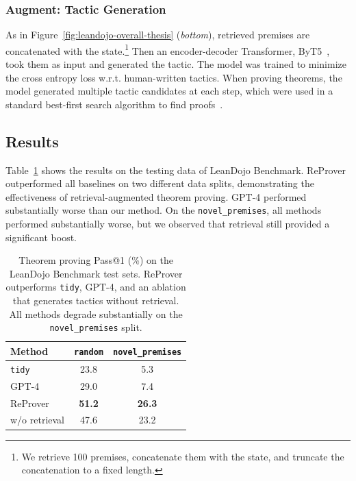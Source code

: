 \subsubsection{Augment: Tactic Generation}

As in Figure~\ref{fig:leandojo-overall-thesis} (\emph{bottom}), retrieved
premises are concatenated with the state.\footnote{We retrieve 100 premises,
concatenate them with the state, and truncate the concatenation to a fixed
length.} Then an encoder-decoder Transformer, ByT5~\citep{xue2022byt5}, took
them as input and generated the tactic. The model was trained to minimize the
cross entropy loss w.r.t. human-written tactics. When proving theorems, the
model generated multiple tactic candidates at each step, which were used in a
standard best-first search algorithm to find proofs~\citep{han2022proof}.

\subsection{Results}

Table~\ref{tab:leandojo-proving-thesis} shows the results on the testing data
of LeanDojo Benchmark. ReProver outperformed all baselines on two different
data splits, demonstrating the effectiveness of retrieval-augmented theorem
proving. GPT-4 performed substantially worse than our method. On the \texttt{novel\_premises},
all methods performed substantially worse, but we observed that retrieval still
provided a significant boost.

\begin{table}[tbp]
\caption{Theorem proving Pass@1 (\%) on the LeanDojo Benchmark test sets.
ReProver outperforms \texttt{tidy}, GPT-4, and an ablation that generates
tactics without retrieval. All methods degrade substantially on the
\texttt{novel\_premises} split.}
\label{tab:leandojo-proving-thesis}
\centering
\small
\begin{tabular}{@{}lcc@{}}
  \toprule
   Method & \texttt{random} & \texttt{novel\_premises} \\
  \midrule
  \texttt{tidy} & 23.8 & 5.3 \\
  GPT-4 & 29.0 & 7.4 \\
  ReProver & \textbf{51.2} & \textbf{26.3} \\
  \quad w/o retrieval & 47.6 & 23.2 \\
  \bottomrule
\end{tabular}
\end{table}

